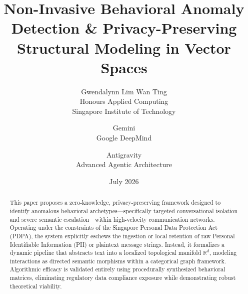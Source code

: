 \documentclass[10pt,twocolumn,letterpaper]{article}
\title{Non-Invasive Behavioral Anomaly Detection \& Privacy-Preserving Structural Modeling in Vector Spaces}
\author{Gwendalynn Lim Wan Ting \\
Honours Applied Computing \\
Singapore Institute of Technology\\
\and
Gemini \\
Google DeepMind\\
\and
Antigravity \\
Advanced Agentic Architecture
}
\date{July 2026}
\begin{document}
\maketitle

\begin{abstract}
This paper proposes a zero-knowledge, privacy-preserving framework designed to identify anomalous behavioral archetypes---specifically targeted conversational isolation and severe semantic escalation---within high-velocity communication networks. Operating under the constraints of the Singapore Personal Data Protection Act (PDPA), the system explicitly eschews the ingestion or local retention of raw Personal Identifiable Information (PII) or plaintext message strings. Instead, it formalizes a dynamic pipeline that abstracts text into a localized topological manifold $\mathbb{R}^d$, modeling interactions as directed semantic morphisms within a categorical graph framework. Algorithmic efficacy is validated entirely using procedurally synthesized behavioral matrices, eliminating regulatory data compliance exposure while demonstrating robust theoretical viability.
\end{abstract}










\end{document}
